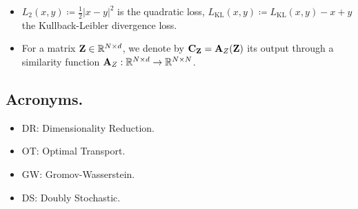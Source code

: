 \begin{itemize}
    \item $L_2(x,y) \coloneqq \frac{1}{2} |x - y|^2$ is the quadratic loss,  $L_{\mathrm{KL}}(x,y) \coloneqq L_{\mathrm{KL}}(x,y) - x + y $ the Kullback-Leibler divergence loss.
    \item For a matrix ${\mathbf{Z}} \in \mathbb{R}^{N \times d}$, we denote by ${\mathbf{C}}_{{\mathbf{Z}}} =  {\mathbf{A}}_{Z}({\mathbf{Z}})$ its output through a similarity function ${\mathbf{A}}_{Z}: \mathbb{R}^{N \times d} \to \mathbb{R}^{N \times N}$.
\end{itemize}

\subsection*{Acronyms.}
\begin{itemize}
	\item DR: Dimensionality Reduction.
	\item OT: Optimal Transport.
	\item GW: Gromov-Wasserstein.
	\item DS: Doubly Stochastic.
\end{itemize}